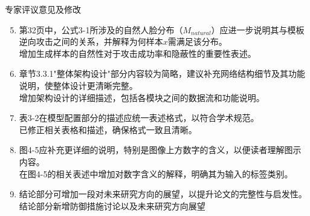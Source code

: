 \documentclass[aspectratio=169,12pt]{beamer}
\begin{document}
\begin{frame}{专家评议意见及修改}
\footnotesize
\begin{enumerate}
\setcounter{enumi}{4}

\item  第32页中，公式3-1所涉及的自然人脸分布（$M_{natural}$）应进一步说明其与模板逆向攻击之间的关系，并解释为何样本$x$需满足该分布。\\
\textcolor{hitblue}{增加生成样本的自然性对于攻击成功率和隐蔽性的重要性表述。}

\item  章节3.3.1"整体架构设计"部分内容较为简略，建议补充网络结构细节及其功能说明，使整体设计更清晰完整。\\
\textcolor{hitblue}{增加架构设计的详细描述，包括各模块之间的数据流和功能说明。}

\item  表3-2在模型配置部分的描述应统一表述格式，以符合学术规范。\\
\textcolor{hitblue}{已修正相关表格和描述，确保格式一致且清晰。}

\item  图4-5应补充更详细的说明，特别是图像上方数字的含义，以便读者理解图示内容。\\
\textcolor{hitblue}{在图4-5的相关表述中增加对数字含义的解释，明确其为输入的标签类别。}

\item  结论部分可增加一段对未来研究方向的展望，以提升论文的完整性与启发性。\\
\textcolor{hitblue}{结论部分新增防御措施讨论以及未来研究方向展望}

\end{enumerate}
\end{frame} %
\end{document}
